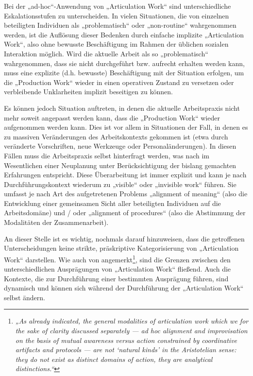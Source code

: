 Bei der „ad-hoc“-Anwendung von „Articulation Work“ sind unterschiedliche Eskalationsstufen zu unterscheiden. In vielen Situationen, die von einzelnen beteiligten Individuen als „problematisch“ oder „non-routine“ wahrgenommen werden, ist die Auflösung dieser Bedenken durch einfache implizite „Articulation Work“, also ohne bewusste Beschäftigung im Rahmen der üblichen sozialen Interaktion möglich. Wird die aktuelle Arbeit als so „problematisch“ wahrgenommen, dass sie nicht durchgeführt bzw. aufrecht erhalten werden kann, muss eine explizite (d.h. bewusste) Beschäftigung mit der Situation erfolgen, um die „Production Work“ wieder in einen operativen Zustand zu versetzen oder verbleibende Unklarheiten implizit beseitigen zu können. 

Es können jedoch Situation auftreten, in denen die aktuelle Arbeitspraxis nicht mehr soweit angepasst werden kann, dass die „Production Work“ wieder aufgenommen werden kann. Dies ist vor allem in Situationen der Fall, in denen es zu massiven Veränderungen des Arbeitskontexts gekommen ist (etwa durch veränderte Vorschriften, neue Werkzeuge oder Personaländerungen). In diesen Fällen muss die Arbeitspraxis selbst hinterfragt werden, was nach \citep{Corbin93} im Wesentlichen einer Neuplanung unter Berücksichtigung der bislang gemachten Erfahrungen entspricht. Diese Überarbeitung ist immer explizit und kann je nach Durchführungskontext wiederum zu „visible“ oder „invisible work“ führen. Sie umfasst je nach Art des aufgetretenen Problems „alignment of meaning“ (also die Entwicklung einer gemeinsamen Sicht aller beteiligten Individuen auf die Arbeitsdomäne) und / oder „alignment of procedures“ (also die Abstimmung der Modalitäten der Zusammenarbeit).

An dieser Stelle ist es wichtig, nochmals darauf hinzuweisen, dass die getroffenen Unterscheidungen keine strikte, präskriptive Kategorisierung von „Articulation Work“ darstellen. Wie auch von \citet{Schmidt00} angemerkt\footnote{\emph{„As already indicated, the general modalities of articulation work which we for the sake of clarity discussed separately — ad hoc alignment and improvisation on the basis of mutual awareness versus action constrained by coordinative artifacts and protocols — are not ‘natural kinds’ in the Aristotelian sense: they do not exist as distinct domains of action, they are analytical distinctions.“}\citep[][S. 7]{Schmidt00}}, sind die Grenzen zwischen den unterschiedlichen Ausprägungen von „Articulation Work“ fließend. Auch die Kontexte, die zur Durchführung einer bestimmten Ausprägung führen, sind dynamisch und können sich während der Durchführung der „Articulation Work“ selbst ändern.

